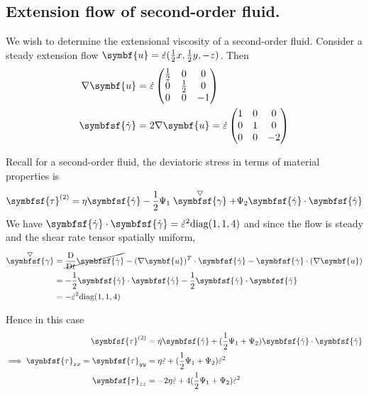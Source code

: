 \documentclass{jknotes}
\begin{document}
\subsection{Extension flow of second-order fluid.}
We wish to determine the extensional viscosity of a second-order fluid.
Consider a steady extension flow $\symbf{u} = \dot{\vare}(\frac{1}{2}x,
\frac{1}{2}y, -z)$. Then
\begin{align}
	\nabla \symbf{u} &= \dot{\vare} \begin{pmatrix} \frac{1}{2} & 0 & 0 \\ 0 &
	\frac{1}{2} & 0 \\ 0 & 0 & -1 \end{pmatrix} \\
	\symbfsf{\srate} &= 2 \nabla \symbf{u} = \dot{\vare} \begin{pmatrix} 1 & 0 & 0
	\\ 0 & 1 & 0 \\ 0 & 0 & -2 \end{pmatrix}
\end{align}

Recall for a second-order fluid, the deviatoric stress in terms of material
properties is
\begin{equation}
	\symbfsf{\tau}^{(2)} = \eta \symbfsf{\srate} - \frac{1}{2} \Psi_1
	\stackrel{\bigtriangledown}{\symbfsf{\gamma}} + \Psi_2
	\symbfsf{\srate}\cdot\symbfsf{\srate}
\end{equation}
We have $\symbfsf{\srate}\cdot\symbfsf{\srate} = \dot{\vare}^2
\text{diag}(1,1,4)$ and since the flow is steady and the shear rate tensor
spatially uniform, 
\begin{align}
	\stackrel{\bigtriangledown}{\symbfsf{\gamma}} &=
	\cancel{\frac{\diffD}{\diffD t} \symbfsf{\srate}} - (\nabla \symbf{u})^T
	\cdot \symbfsf{\srate} - \symbfsf{\srate} \cdot (\nabla \symbf{u}) \\
	&= -\frac{1}{2} \symbfsf{\srate} \cdot \symbfsf{\srate}-\frac{1}{2}
	\symbfsf{\srate} \cdot \symbfsf{\srate} \\
	&= -\dot{\vare}^2 \text{diag}(1,1,4)
\end{align}
	
Hence in this case 
\begin{align}
	\symbfsf{\tau}^{(2)} &= \eta \symbfsf{\srate} + (\frac{1}{2} \Psi_1 +
	\Psi_2) \symbfsf{\srate}\cdot\symbfsf{\srate} \\
	\implies \symbfsf{\tau}_{xx} = \symbfsf{\tau}_{yy} &= \eta \dot{\vare} +
	(\frac{1}{2}\Psi_1 + \Psi_2) \dot{\vare}^2 \\
	\symbfsf{\tau}_{zz} &= -2 \eta \dot{\vare} + 4(\frac{1}{2}\Psi_1 + \Psi_2)
	\dot{\vare}^2 
\end{align}
\end{document}
